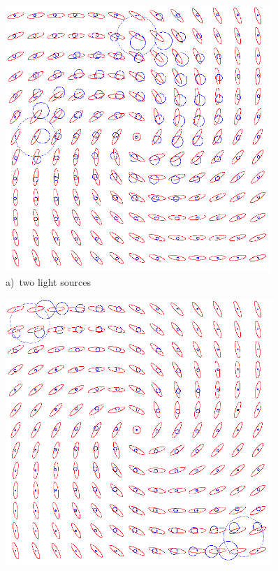 \documentclass{scrartcl}
\begin{document}
\begin{figure}[!t]
\centering
  \begin{minipage}{0.4\textwidth}
    \centering
    \includegraphics[width=0.9\textwidth]{img/spiral-two-dense.png}
    \label{a)}
	a)~two light sources
  \end{minipage}
  \begin{minipage}{0.4\textwidth}
    \centering
    \includegraphics[width=0.9\textwidth]{img/spiral-two-wide.png}

\end{minipage}
\end{figure}
\end{document}
